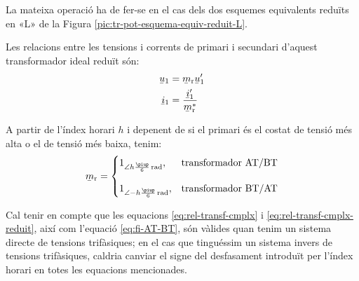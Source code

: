 La mateixa operació ha de fer-se en el cas dels dos esquemes equivalents reduïts en «L» de la Figura \vref{pic:tr-pot-esquema-equiv-reduit-L}.

Les relacions entre les tensions i corrents de primari i secundari d'aquest transformador ideal reduït són:
\begin{subequations}
\begin{align}
    \cmplx{u}_1 &= \cmplx{m}\ped{r}\cmplx{u}'_1\\  \cmplx{i}_1 &= \frac{\cmplx{i}'_1}{\cmplx{m}^*\ped{r}}
\end{align}
\end{subequations}

A partir de l'índex horari $h$ i depenent de si el primari és el costat de tensió més alta o el de tensió més baixa, tenim:
\begin{equation}
\cmplx{m}\ped{r} = \begin{cases}
      1_{\angle h\frac{\piup}{6}\unit{rad}}, & \text{transformador AT/BT}\\[2.7ex]
      1_{\angle -h\frac{\piup}{6}\unit{rad}}, & \text{transformador BT/AT}
\end{cases}
\label{eq:rel-transf-cmplx-reduit}
\end{equation}

Cal tenir en compte que les equacions \eqref{eq:rel-transf-cmplx} i \eqref{eq:rel-transf-cmplx-reduit}, així com l'equació \eqref{eq:fi-AT-BT}, són vàlides quan tenim un sistema directe de tensions trifàsiques; en el cas que tinguéssim un sistema invers de tensions trifàsiques, caldria canviar el signe del desfasament introduït per l'índex horari en totes les equacions mencionades.


